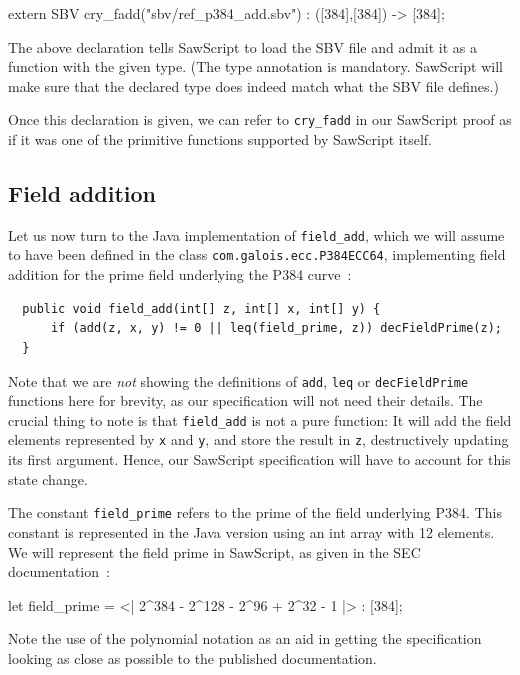 \documentclass[12pt]{galois-whitepaper}
\newcommand{\sawScript}{{\sc SawScript}\xspace}
\begin{document}
\begin{code}
  extern SBV cry_fadd("sbv/ref_p384_add.sbv") : ([384],[384]) -> [384];
\end{code}

The above declaration tells \sawScript to load the SBV file and admit it as a function with the given type. (The type
annotation is mandatory. \sawScript will make sure that the declared type does indeed match what the SBV file defines.)

Once this declaration is given, we can refer to {\tt cry\_fadd} in our \sawScript proof as if it was one of the primitive functions
supported by \sawScript itself.

\subsection{Field addition}\label{sec:fieldadd}
Let us now turn to the Java implementation of {\tt field\_add}, which we will assume to have
been defined in the class {\tt com.galois.ecc.P384ECC64}, implementing
field addition for the prime field underlying the P384 curve~\cite[Section 2.8.1]{sec2}:
\begin{Verbatim}
  public void field_add(int[] z, int[] x, int[] y) {
      if (add(z, x, y) != 0 || leq(field_prime, z)) decFieldPrime(z);
  }
\end{Verbatim}
Note that we are {\em not} showing the definitions of {\tt add}, {\tt leq} or {\tt decFieldPrime}
functions here for brevity, as our specification will not need their details. The crucial thing to note is
that {\tt field\_add} is not a pure function: It will add the field elements represented by {\tt x} and {\tt y},
and store the result in {\tt z}, destructively updating its first argument. Hence, our \sawScript specification
will have to account for this state change.

The constant {\tt field\_prime} refers to the prime of the field underlying
P384. This constant is represented in the Java version using an int array with 12 elements. We will represent the field prime
in \sawScript, as given in the SEC documentation~\cite[Section 2.8.1]{sec2}:

\begin{code}
  let field_prime = <| 2^384 - 2^128 - 2^96 + 2^32 - 1 |> : [384];
\end{code}
Note the use of the polynomial notation as an aid in getting the specification looking as close as possible to the published
documentation.
\end{document}
